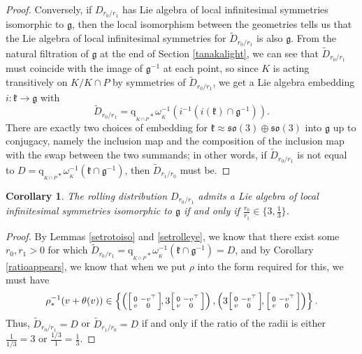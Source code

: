 \documentclass[12pt,a4paper]{amsart}
\newtheorem{corollary}[theorem]{Corollary}
\theoremstyle{definition}
\newcommand{\MC}[1]{\omega_{{}_{#1}}}
\newenvironment{smallbmatrix}
  {\left[\begin{smallmatrix}}
  {\end{smallmatrix}\right]}
\begin{document}
\begin{proof}
Conversely, if $D_{r_0/r_1}$ has Lie algebra of local infinitesimal symmetries isomorphic to $\mathfrak{g}$, then the local isomorphism between the geometries tells us that the Lie algebra of local infinitesimal symmetries for $\tilde{D}_{r_0/r_1}$ is also $\mathfrak{g}$. From the natural filtration of $\mathfrak{g}$ at the end of Section \ref{tanakalight}, we can see that $\tilde{D}_{r_0/r_1}$ must coincide with the image of $\mathfrak{g}^{-1}$ at each point, so since $K$ is acting transitively on $K/K\cap P$ by symmetries of $\tilde{D}_{r_0/r_1}$, we get a Lie algebra embedding $i:\mathfrak{k}\to\mathfrak{g}$ with
\[\tilde{D}_{r_0/r_1}=\mathrm{q}_{{}_{K\cap P}*}\MC{K}^{-1}(i^{-1}(i(\mathfrak{k})\cap\mathfrak{g}^{-1})).\]
There are exactly two choices of embedding for $\mathfrak{k}\approx\mathfrak{so}(3)\oplus\mathfrak{so}(3)$ into $\mathfrak{g}$ up to conjugacy, namely the inclusion map and the composition of the inclusion map with the swap between the two summands; in other words, if $\tilde{D}_{r_0/r_1}$ is not equal to $D=\mathrm{q}_{{}_{K\cap P}*}\MC{K}^{-1}(\mathfrak{k}\cap\mathfrak{g}^{-1})$, then $\tilde{D}_{r_1/r_0}$ must be.\mbox{\qedhere}\end{proof}

\begin{corollary}The rolling distribution $D_{r_0/r_1}$ admits a Lie algebra of local infinitesimal symmetries isomorphic to $\mathfrak{g}$ if and only if $\tfrac{r_0}{r_1}\in\{3,\tfrac{1}{3}\}$.\end{corollary}
\begin{proof}By Lemmas \ref{setrotoiso} and \ref{setrolleye}, we know that there exist some $r_0,r_1>0$ for which $\tilde{D}_{r_0/r_1}=\mathrm{q}_{{}_{K\cap P}*}\MC{K}^{-1}(\mathfrak{k}\cap\mathfrak{g}^{-1})=D$, and by Corollary \ref{ratioappears}, we know that when we put $\rho$ into the form required for this, we must have
\[\rho_*^{-1}(v+\theta(v))\in\left\{\left(\begin{smallbmatrix}0 & -v^\top \\ v & 0\end{smallbmatrix}\!,3\begin{smallbmatrix}0 & -v^\top \\ v & 0\end{smallbmatrix}\right),\left(3\begin{smallbmatrix}0 & -v^\top \\ v & 0\end{smallbmatrix}\!,\begin{smallbmatrix}0 & -v^\top \\ v & 0\end{smallbmatrix}\right)\right\}.\]
Thus, $\tilde{D}_{r_0/r_1}=D$ or $\tilde{D}_{r_1/r_0}=D$ if and only if the ratio of the radii is either $\tfrac{1}{1/3}=3$ or $\tfrac{1/3}{1}=\tfrac{1}{3}$.\mbox{\qedhere}\end{proof}
\end{document}
